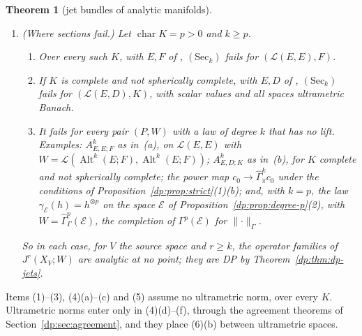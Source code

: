 \documentclass[11pt]{amsart}
\newtheorem{theorem}{Theorem}[section]
\theoremstyle{definition}
\theoremstyle{remark}
\numberwithin{equation}{section}
\newcommand{\cL}{\mathcal L}
\newcommand{\Alt}{\operatorname{Alt}}
\newcommand{\norm}[1]{\lVert #1\rVert}
\theoremstyle{plain}
\theoremstyle{definition}
\theoremstyle{plain}
\newcommand{\hGamma}{\widehat\Gamma}
\begin{document}
\begin{theorem}[jet bundles of analytic manifolds]
\begin{enumerate}
\item \textup{(Where sections fail.)} Let $\operatorname{char}K=p>0$ and $k\ge p$.
\begin{enumerate}
\item Over every such $K$, with $E,F$ of \cite[Theorem~7.2(1)]{I}, $(\mathrm{Sec}_k)$ fails for $(\cL(E,E),F)$.
\item If $K$ is complete and not spherically complete, with $E,D$ of \cite[Theorem~7.2(2)]{I}, $(\mathrm{Sec}_k)$ fails for $(\cL(E,D),K)$, with scalar values and all spaces ultrametric Banach.
\item It fails for every pair $(P,W)$ with a law of degree $k$ that has no lift. Examples: $A^k_{E,E;F}$ as in~\textup{(a)}, on $\cL(E,E)$ with $W=\cL(\Alt^k(E;F),\Alt^k(E;F))$; $A^k_{E,D;K}$ as in~\textup{(b)}, for $K$ complete and not spherically complete; the power map $c_0\to\hGamma^k_\pi c_0$ under the conditions of Proposition~\ref{dp:prop:strict}\textup{(1)(b)}; and, with $k=p$, the law $\gamma_{\mathcal E}(h)=h^{\otimes p}$ on the space $\mathcal E$ of Proposition~\ref{dp:prop:degree-p}\textup{(2)}, with $W=\hGamma^p_\Gamma(\mathcal E)$, the completion of $\Gamma^p(\mathcal E)$ for $\norm\cdot_\Gamma$.
\end{enumerate}
So in each case, for $V$ the source space and $r\ge k$, the operator families of $J^r(X_V;W)$ are analytic at no point; they are DP by Theorem~\ref{dp:thm:dp-jets}.
\end{enumerate}
\end{theorem}

Items (1)--(3), (4)(a)--(c) and (5) assume no ultrametric norm, over every $K$. Ultrametric norms enter only in (4)(d)--(f), through the agreement theorems of Section~\ref{dp:sec:agreement}, and they place (6)(b) between ultrametric spaces.
\end{document}
